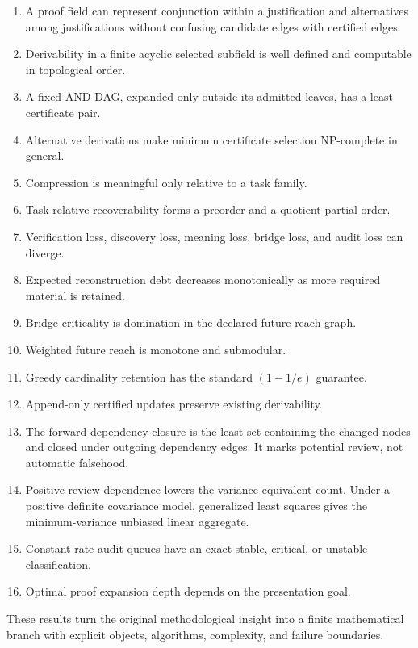 \begin{enumerate}
\item A proof field can represent conjunction within a justification and alternatives among justifications without confusing candidate edges with certified edges.
\item Derivability in a finite acyclic selected subfield is well defined and computable in topological order.
\item A fixed AND-DAG, expanded only outside its admitted leaves, has a least certificate pair.
\item Alternative derivations make minimum certificate selection NP-complete in general.
\item Compression is meaningful only relative to a task family.
\item Task-relative recoverability forms a preorder and a quotient partial order.
\item Verification loss, discovery loss, meaning loss, bridge loss, and audit loss can diverge.
\item Expected reconstruction debt decreases monotonically as more required material is retained.
\item Bridge criticality is domination in the declared future-reach graph.
\item Weighted future reach is monotone and submodular.
\item Greedy cardinality retention has the standard $(1-1/e)$ guarantee.
\item Append-only certified updates preserve existing derivability.
\item The forward dependency closure is the least set containing the changed nodes and closed under outgoing dependency edges. It marks potential review, not automatic falsehood.
\item Positive review dependence lowers the variance-equivalent count. Under a positive definite covariance model, generalized least squares gives the minimum-variance unbiased linear aggregate.
\item Constant-rate audit queues have an exact stable, critical, or unstable classification.
\item Optimal proof expansion depth depends on the presentation goal.
\end{enumerate}

These results turn the original methodological insight into a finite mathematical branch with explicit objects, algorithms, complexity, and failure boundaries.

